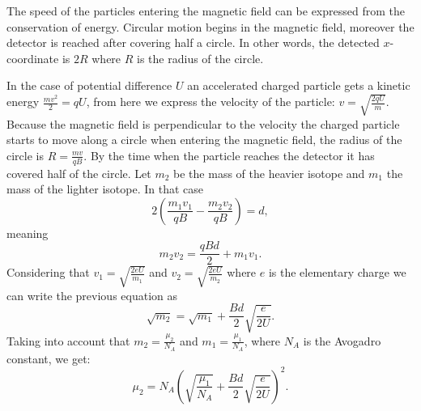 \hinteng
The speed of the particles entering the magnetic field can be expressed from the conservation of energy. Circular motion begins in the magnetic field, moreover the detector is reached after covering half a circle. In other words, the detected $x$-coordinate is $2R$ where $R$ is the radius of the circle.

\solueng
In the case of potential difference $U$ an accelerated charged particle gets a kinetic energy $\frac{mv^{2}}{2}=qU$, from here we express the velocity of the particle: $v=\sqrt{\frac{2qU}{m}}$. Because the magnetic field is perpendicular to the velocity the charged particle starts to move along a circle when entering the magnetic field, the radius of the circle is $R=\frac{mv}{qB}$. By the time when the particle reaches the detector it has covered half of the circle. Let $m_{2}$ be the mass of the heavier isotope and $m_{1}$ the mass of the lighter isotope. In that case
\[ 
2\left(\frac{m_{1}v_{1}}{qB}-\frac{m_{2}v_{2}}{qB}\right)=d, 
\]
meaning 
\[ 
m_{2}v_{2}=\frac{qBd}{2}+m_{1}v_{1 }.
\]
Considering that $v_{1}=\sqrt{\frac{2eU}{m_{1}}}$ and $v_{2}=\sqrt{\frac{2eU}{m_{2}}}$ where $e$ is the elementary charge we can write the previous equation as 
\[ \sqrt{m_{2}}=\sqrt{m_{1}}+\frac{Bd}{2}\sqrt{\frac{e}{2U}}. \]
Taking into account that $m_{2}=\frac{\mu_{2}}{N_{A}}$ and $m_{1}=\frac{\mu_{1}}{N_{A}}$, where $N_{A}$ is the Avogadro constant, we get:
\[ \mu_{2}=N_{A}\left(\sqrt{\frac{\mu_{1}}{N_{A}}}+\frac{Bd}{2}\sqrt{\frac{e}{2U}}\right)^{2}.\]
\probend